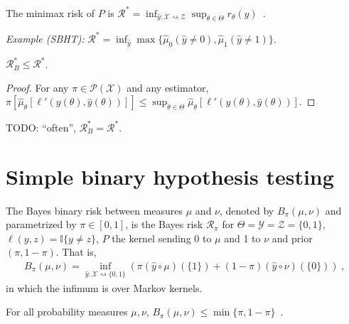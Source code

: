 \begin{definition}
  \label{def:minimaxRisk}
  The minimax risk of $P$ is $\mathcal R^* = \inf_{\hat{y} : \mathcal X \rightsquigarrow \mathcal Z} \sup_{\theta \in \Theta} r_\theta(\hat{y})$~.
\end{definition}

\emph{Example (SBHT):} $\mathcal R^* = \inf_{\hat{y}} \max\{\hat{\mu}_0(\hat{y} \ne 0), \hat{\mu}_1(\hat{y} \ne 1)\}$.

\begin{lemma}
  \label{lem:bayesRisk_le_minimaxRisk}
  $\mathcal R_B^* \le \mathcal R^*$.
\end{lemma}

\begin{proof}
For any $\pi \in \mathcal P(\mathcal X)$ and any estimator, $\pi\left[\hat{\mu}_\theta\left[\ell'(y(\theta), \hat{y}(\theta))\right]\right] \le \sup_{\theta \in \Theta}\hat{\mu}_\theta\left[\ell'(y(\theta), \hat{y}(\theta))\right]$.
\end{proof}

TODO: ``often'', $\mathcal R^*_B = \mathcal R^*$.

\section{Simple binary hypothesis testing}

\begin{definition}
  \label{def:bayesBinaryRisk}
  The Bayes binary risk between measures $\mu$ and $\nu$, denoted by $B_\pi(\mu, \nu)$ and parametrized by $\pi \in [0,1]$, is the Bayes risk $\mathcal R_\pi$ for $\Theta = \mathcal Y = \mathcal Z = \{0,1\}$, $\ell(y,z) = \mathbb{I}\{y \ne z\}$, $P$ the kernel sending 0 to $\mu$ and 1 to $\nu$ and prior $(\pi, 1-\pi)$.
  That is,
  \begin{align*}
  B_\pi(\mu, \nu) = \inf_{\hat{y} : \mathcal X \rightsquigarrow \{0,1\}}\left(\pi (\hat{y} \circ \mu)(\{1\}) + (1 - \pi) (\hat{y} \circ \nu)(\{0\})\right)
  \: ,
  \end{align*}
  in which the infimum is over Markov kernels.
\end{definition}

\begin{lemma}
  \label{lem:bayesBinaryRisk_le}
  For all probability measures $\mu, \nu$, $B_\pi(\mu, \nu) \le \min\{\pi, 1 - \pi\}$~.
\end{lemma}

